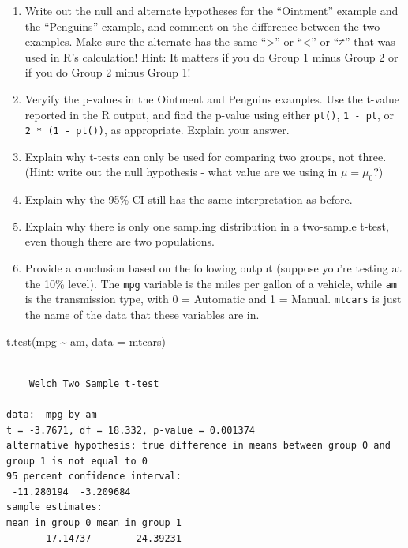 \documentclass[
  letterpaper,
  DIV=11,
  numbers=noendperiod,
  oneside]{scrreprt}
\newenvironment{Shaded}{\begin{snugshade}}{\end{snugshade}}
\newcommand{\AttributeTok}[1]{\textcolor[rgb]{0.40,0.45,0.13}{#1}}
\newcommand{\FunctionTok}[1]{\textcolor[rgb]{0.28,0.35,0.67}{#1}}
\newcommand{\NormalTok}[1]{\textcolor[rgb]{0.00,0.23,0.31}{#1}}
\newcommand{\SpecialCharTok}[1]{\textcolor[rgb]{0.37,0.37,0.37}{#1}}
\providecommand{\tightlist}{%
  \setlength{\itemsep}{0pt}\setlength{\parskip}{0pt}}\usepackage{longtable,booktabs,array}
\begin{document}
\begin{enumerate}
\def\labelenumi{\arabic{enumi}.}
\tightlist
\item
  Write out the null and alternate hypotheses for the ``Ointment''
  example and the ``Penguins'' example, and comment on the difference
  between the two examples. Make sure the alternate has the same
  ``\textgreater{}'' or ``\textless{}'' or ``≠'' that was used in R's
  calculation! Hint: It matters if you do Group 1 minus Group 2 or if
  you do Group 2 minus Group 1!
\item
  Veryify the p-values in the Ointment and Penguins examples. Use the
  t-value reported in the R output, and find the p-value using either
  \texttt{pt()}, \texttt{1\ -\ pt}, or \texttt{2\ *\ (1\ -\ pt())}, as
  appropriate. Explain your answer.
\item
  Explain why t-tests can only be used for comparing two groups, not
  three. (Hint: write out the null hypothesis - what value are we using
  in \(\mu = \mu_0\)?)
\item
  Explain why the 95\% CI still has the same interpretation as before.
\item
  Explain why there is only one sampling distribution in a two-sample
  t-test, even though there are two populations.
\item
  Provide a conclusion based on the following output (suppose you're
  testing at the 10\% level). The \texttt{mpg} variable is the miles per
  gallon of a vehicle, while \texttt{am} is the transmission type, with
  0 = Automatic and 1 = Manual. \texttt{mtcars} is just the name of the
  data that these variables are in.
\end{enumerate}

\begin{Shaded}
\begin{Highlighting}[]
\FunctionTok{t.test}\NormalTok{(mpg }\SpecialCharTok{\textasciitilde{}}\NormalTok{ am, }\AttributeTok{data =}\NormalTok{ mtcars)}
\end{Highlighting}
\end{Shaded}

\begin{verbatim}

    Welch Two Sample t-test

data:  mpg by am
t = -3.7671, df = 18.332, p-value = 0.001374
alternative hypothesis: true difference in means between group 0 and group 1 is not equal to 0
95 percent confidence interval:
 -11.280194  -3.209684
sample estimates:
mean in group 0 mean in group 1 
       17.14737        24.39231 
\end{verbatim}
\end{document}
